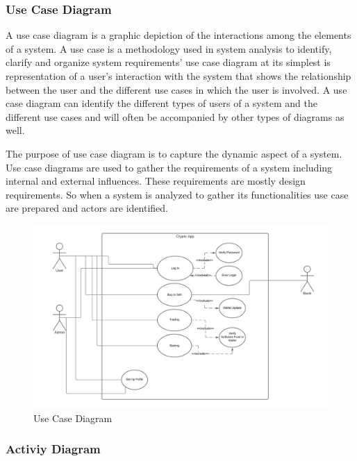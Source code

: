 \documentclass[12pt]{article}
\begin{document}
\newpage
\subsubsection{Use Case Diagram}

A use case diagram is a graphic depiction of the interactions among the
elements of a system. A use case is a methodology used in system analysis
to identify, clarify and organize system requirements’ use case diagram at its
simplest is representation of a user's interaction with the system that shows the
relationship between the user and the different use cases in which the user is
involved. A use case diagram can identify the different types of users of a system
and the different use cases and will often be accompanied by other types of
diagrams as well.
\par The purpose of use case diagram is to capture the dynamic aspect of a
system. Use case diagrams are used to gather the requirements of a system
including internal and external influences. These requirements are mostly design
requirements. So when a system is analyzed to gather its functionalities use case
are prepared and actors are identified.


\begin{figure}[h!]
\begin{center}
\includegraphics[scale=.99]{USE}
\caption{Use Case Diagram}
\end{center}
\end{figure}



\subsubsection{Activiy Diagram}
\end{document}
